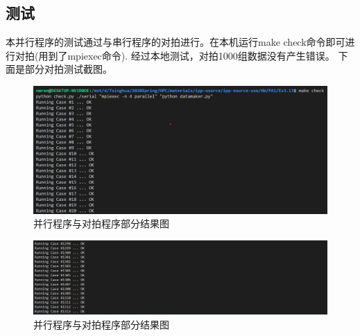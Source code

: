 \documentclass[UTF8]{article}
\begin{document}
\subsection{测试}
本并行程序的测试通过与串行程序的对拍进行。在本机运行make check命令即可进行对拍(用到了mpiexec命令). 经过本地测试，对拍1000组数据没有产生错误。
下面是部分对拍测试截图。

\begin{figure}[h]
    \centering
    \includegraphics[width=\textwidth]{checkResult.png}
    \caption{并行程序与对拍程序部分结果图}
\end{figure}

\begin{figure}[h]
    \centering
    \includegraphics[width=\textwidth]{checkResult1.png}
    \caption{并行程序与对拍程序部分结果图}
\end{figure}


\newpage


 
\end{document}
